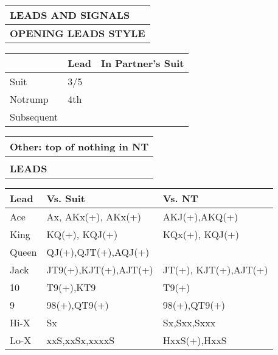 \documentclass{article}
\begin{document}
\begin{minipage}{90mm}
	\begin{tabular}{| p{88mm} |}
		\hline
		\cellcolor[gray]{0.9} \textbf{LEADS AND SIGNALS} \\ \hline
		\textbf{OPENING LEADS STYLE} \\ \hline
	\end{tabular}
	\begin{tabular}{| p{15.25mm} | p{32mm} | p{32mm} |}
		& Lead & In Partner's Suit \\ \hline
		Suit       &3/5 & \\ \hline
		Notrump    &4th & \\ \hline
		Subsequent & & \\ \hline
	\end{tabular}
	\begin{tabular}{| p{88mm} |}
		Other: top of nothing in NT \\ \hline
		\\ \hline
		\textbf{LEADS} \\ \hline
	\end{tabular}
	\begin{tabular}{| p{11.25mm} | p{34mm} | p{34mm} |}
		Lead   & Vs. Suit            & Vs. NT \\ \hline
                Ace    &Ax, AKx(+), AKx(+)   & AKJ(+),AKQ(+) \\ \hline
                King   &KQ(+), KQJ(+)        &KQx(+), KQJ(+) \\ \hline
                Queen  &QJ(+),QJT(+),AQJ(+)  & \\ \hline
                Jack   &JT9(+),KJT(+),AJT(+)      & JT(+), KJT(+),AJT(+) \\ \hline
                10     &T9(+),KT9         & T9(+) \\ \hline
                9      &98(+),QT9(+)         & 98(+),QT9(+) \\ \hline

                Hi-X   & Sx                  &Sx,Sxx,Sxxx \\ \hline
                Lo-X   &xxS,xxSx,xxxxS       & HxxS(+),HxxS\\ \hline
	\end{tabular}
	\begin{tabular}{| p{88mm} |}


\end{tabular}
\end{minipage}
\end{document}
